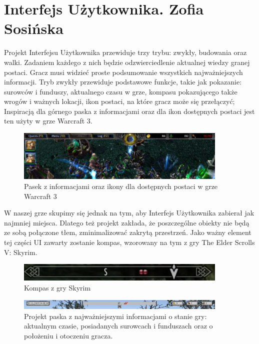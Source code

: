 \section{Interfejs Użytkownika. Zofia Sosińska}\label{chap:ui}

Projekt Interfejsu Użytkownika przewiduje trzy trybu: zwykły, budowania oraz walki. Zadaniem każdego z nich będzie odzwierciedlenie aktualnej wiedzy granej postaci. Gracz musi widzieć proste podsumowanie wszystkich najważniejszych informacji.
	Tryb zwykły przewiduje podstawowe funkcje, takie jak pokazanie:
surowców i funduszy,
aktualnego czasu w grze, 
kompasu pokazującego także wrogów i ważnych lokacji,
ikon postaci, na które gracz może się przełączyć;
Inspiracją dla górnego paska z informacjami oraz dla ikon dostępnych postaci jest ten użyty w grze Warcraft 3.

\begin{figure}[htbp]
    \centering
    \includegraphics[width=0.9\textwidth]{images/ui/warcraft3.png}
    \caption{Pasek z informacjami oraz ikony dla dostępnych postaci w grze Warcraft 3}\label{fig:Warcraft3}
\end{figure}

W naszej grze skupimy się jednak na tym, aby Interfejs Użytkownika zabierał jak najmniej miejsca. Dlatego też projekt zakłada, że poszczególne obiekty nie będą ze sobą połączone tłem, zminimalizować zakrytą przestrzeń.
Jako ważny element tej części UI zawarty zostanie kompas, wzorowany na tym z gry The Elder Scrolls V: Skyrim.

\begin{figure}[htbp]
    \centering
    \includegraphics[width=0.9\textwidth]{images/ui/compassSkyrim.png}
    \caption{Kompas z gry Skyrim}\label{fig:Fallout}
\end{figure}


\begin{figure}[htbp]
    \centering
    \includegraphics[width=0.9\textwidth]{images/ui/naszpasek.png}
    \caption{Projekt paska z najważniejszymi informacjami o stanie gry: aktualnym czasie, posiadanych surowcach i funduszach oraz o położeniu i otoczeniu gracza.
    }\label{fig:compass}
\end{figure}
 

